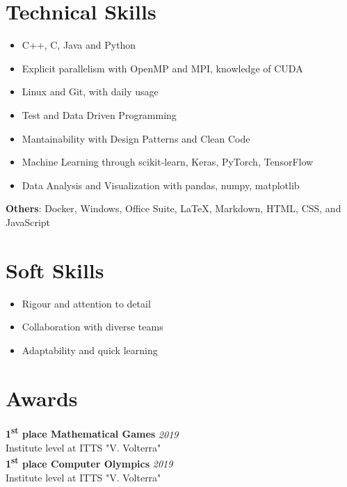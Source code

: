 \documentclass[a4paper,10pt]{article}
\begin{document}
\begin{minipage}[t]{0.33\textwidth}
    \section*{Technical Skills}
    \vspace{-0.1cm}
    \begin{itemize}[left=0.2cm, label={\textbullet}]
        \item C++, C, Java and Python %
        \item Explicit parallelism with OpenMP and MPI, knowledge of CUDA
        \item Linux and Git, with daily usage
        \item Test and Data Driven Programming
        \item Mantainability with Design Patterns and Clean Code
        \item Machine Learning through scikit-learn, Keras, PyTorch, TensorFlow
        \item Data Analysis and Visualization with pandas, numpy, matplotlib
    \end{itemize}
    \textbf{Others}: Docker, Windows, Office Suite, \LaTeX , Markdown, HTML, CSS, and JavaScript
    
    \section*{Soft Skills}
    \begin{itemize}[left=0.2cm, label={\textbullet}]
        \item Rigour and attention to detail
        \item Collaboration with diverse teams
        \item Adaptability and quick learning
    \end{itemize}

    \section*{Awards}
        \textbf{1\textsuperscript{st} place Mathematical Games} \hfill \textit{2019} \\ Institute level at ITTS "V. Volterra" \\

        \textbf{1\textsuperscript{st} place Computer Olympics} \hfill \textit{2019} \\ Institute level at ITTS "V. Volterra"


\end{minipage}
\end{document}
